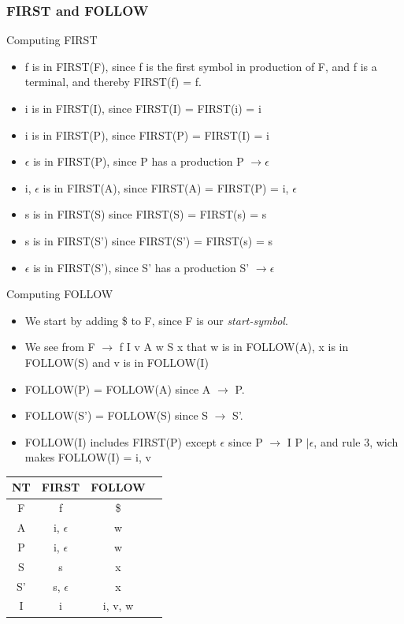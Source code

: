 \documentclass{article}
\begin{document}
\subsubsection*{{\ttfamily FIRST} and {\ttfamily FOLLOW}}
Computing {\ttfamily FIRST}
\begin{itemize}
  \item f is in FIRST(F), since f is the first symbol in production of F, and f
  is a terminal, and thereby FIRST(f) = f.
  \item i is in FIRST(I), since FIRST(I) = FIRST(i) = i
  \item i is in FIRST(P), since FIRST(P) = FIRST(I) = i 
  \item $\epsilon$ is in FIRST(P), since P has a production P $\rightarrow
  \epsilon$
  \item i, $\epsilon$ is in FIRST(A), since FIRST(A) = FIRST(P) = i, $\epsilon$
  \item s is in FIRST(S) since FIRST(S) = FIRST(s) = s 
  \item s is in FIRST(S') since FIRST(S') = FIRST(s) = s 
  \item $\epsilon$ is in FIRST(S'), since S' has a production S' $\rightarrow
  \epsilon$
\end{itemize}
Computing {\ttfamily FOLLOW}
\begin{itemize}
  \item We start by adding \$ to F, since F is our \emph{start-symbol}.
  \item We see from F $\rightarrow$ f I v A w S x that w is in FOLLOW(A), x
  is in FOLLOW(S) and v is in FOLLOW(I)
  \item FOLLOW(P) = FOLLOW(A) since A $\rightarrow$ P. 
  \item FOLLOW(S') = FOLLOW(S) since S $\rightarrow$ S'.
  \item FOLLOW(I) includes FIRST(P) except $\epsilon$ since P $\rightarrow$ I P
  $| \epsilon$, and rule 3, wich makes FOLLOW(I) = i, v
\end{itemize}
\begin{tabular}{|c|c|c|c|}
\hline
NT & FIRST & FOLLOW \\
\hline
\hline
F  & f & \$ \\
A  & i, $\epsilon$ & w \\
P  & i, $\epsilon$ & w \\
S  & s & x \\
S' & s, $\epsilon$ & x \\
I  & i & i, v, w \\
\hline
\end{tabular}
\end{document}
